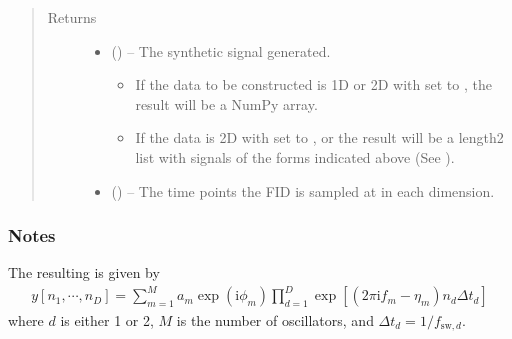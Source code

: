 \documentclass[letterpaper,10pt,english]{sphinxmanual}
\begin{document}
\begin{fulllineitems}
\begin{quote}
\begin{description}
\begin{itemize}
\end{itemize}

\item[{Returns}] \leavevmode
\sphinxAtStartPar
\begin{itemize}
\item {} 
\sphinxAtStartPar
{} () – The synthetic signal generated.
\begin{itemize}
\item {} 
\sphinxAtStartPar
If the data to be constructed is 1D or 2D with  set to
, the result will be a NumPy array.

\item {} 
\sphinxAtStartPar
If the data is 2D with  set to , or 
the result will be a length\sphinxhyphen{}2 list with signals of the forms
indicated above (See ).

\end{itemize}

\item {} 
\sphinxAtStartPar
{} () – The time points the FID is sampled at in each dimension.

\end{itemize}


\end{description}\end{quote}
\subsubsection*{Notes}

\sphinxAtStartPar
The resulting  is given by
\begin{equation*}
\begin{split}y[n_1, \cdots, n_D] =
\sum_{m=1}^{M} a_m \exp\left(\mathrm{i} \phi_m\right)
\prod_{d=1}^{D}
\exp\left[\left(2 \pi \mathrm{i} f_m - \eta_m\right)
n_d \Delta t_d\right]\end{split}
\end{equation*}
\sphinxAtStartPar
where \(d\) is either 1 or 2, \(M\) is the number of
oscillators, and \(\Delta t_d = 1 / f_{\mathrm{sw}, d}\).

\end{fulllineitems}
\end{document}
